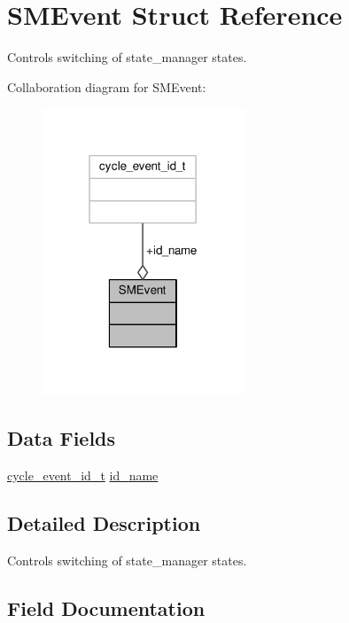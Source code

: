 \hypertarget{struct_s_m_event}{}\section{S\+M\+Event Struct Reference}
\label{struct_s_m_event}


Controls switching of state\+\_\+manager states.  




Collaboration diagram for S\+M\+Event\+:\nopagebreak
\begin{figure}[H]
\begin{center}
\leavevmode
\includegraphics[width=171pt]{struct_s_m_event__coll__graph}
\end{center}
\end{figure}
\subsection*{Data Fields}
\begin{DoxyCompactItemize}
\item 
\hyperlink{states_8h_a1956f5c4955f21ca67d43209bc162438}{cycle\+\_\+event\+\_\+id\+\_\+t} \hyperlink{struct_s_m_event_a20f4c1f646da07c42e0e23c9f5dc5c30}{id\+\_\+name}
\end{DoxyCompactItemize}


\subsection{Detailed Description}
Controls switching of state\+\_\+manager states. 

\subsection{Field Documentation}
